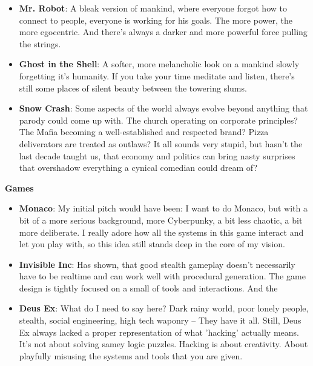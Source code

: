 \documentclass[11pt,a4paper]{article}
\begin{document}
\begin{itemize}
    \item \textbf{Mr. Robot}: A bleak version of mankind, where everyone forgot how to connect to people,
            everyone is working for his goals. The more power, the more egocentric. And there's
            always a darker and more powerful force pulling the strings.
    \item \textbf{Ghost in the Shell}: A softer, more melancholic look on a mankind slowly forgetting it's
            humanity. If you take your time meditate and listen, there's still some places of silent
            beauty between the towering slums.
    \item \textbf{Snow Crash}: Some aspects of the world always evolve beyond anything that parody could come
            up with. The church operating on corporate principles? The Mafia becoming a
            well-established and respected brand? Pizza deliverators are treated as outlaws?
            It all sounds very stupid, but hasn't the last decade taught us, that economy and politics
            can bring nasty surprises that overshadow everything a cynical comedian could dream of?
\end{itemize}

\textbf{Games}

\begin{itemize}
    \item \textbf{Monaco}: My initial pitch would have been: I want to do Monaco, but with a bit of a more serious
                background, more Cyberpunky, a bit less chaotic, a bit more deliberate. I really adore how all
                the systems in this game interact and let you play with, so this idea still stands deep in the
                core of my vision.
    \item \textbf{Invisible Inc}: Has shown, that good stealth gameplay doesn't necessarily have to be realtime
                and can work well with procedural generation. The game design is tightly focused on a small
                of tools and interactions. And the
    \item \textbf{Deus Ex}: What do I need to say here? Dark rainy world, poor lonely people, stealth,
                social engineering, high tech waponry -- They have it all. Still, Deus Ex always lacked a proper representation of
                what 'hacking' actually means. It's not about solving samey logic puzzles. Hacking is about creativity.
                About playfully misusing the systems and tools that you are given.
\end{itemize}
\end{document}

